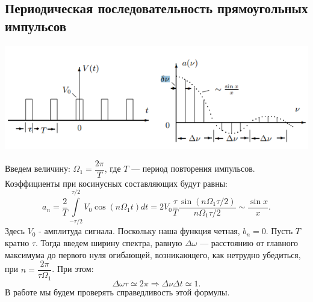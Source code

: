 \subsection*{Периодическая последовательность прямоугольных импульсов}
\begin{center}
\includegraphics[scale=0.9]{2.png}
\end{center}
Введем величину: $\Omega_1 = \dfrac{2\pi}{T}$,
где $T$ --- период повторения импульсов.
\n\n
Коэффициенты при косинусных составляющих будут равны:
\begin{equation}
a_n = \dfrac{2}{T}\int\limits_{-\tau/2}^{\tau/2}V_0\cos\left(n\Omega_1 t\right)dt = 2V_0\dfrac{\tau}{T}\dfrac{\sin\left(n\Omega_1\tau/2\right)}{n\Omega_1\tau/2} \sim \dfrac{\sin x}{x}.
\end{equation}
\n
Здесь $V_0$ - амплитуда сигнала.
\n
Поскольку наша функция четная, $b_n = 0$. 
\n
Пусть $T$ кратно $\tau$. Тогда введем ширину спектра, равную $\Delta \omega$ --- расстоянию от главного максимума до первого нуля огибающей, возникающего, как нетрудно убедиться, при $n = \dfrac{2\pi}{\tau \Omega_1}$. При 
этом:
\begin{equation}
\Delta \omega \tau \simeq 2\pi \Rightarrow \Delta \nu \Delta t \simeq 1.
\end{equation}
\n В работе мы будем проверять справедливость этой формулы.
